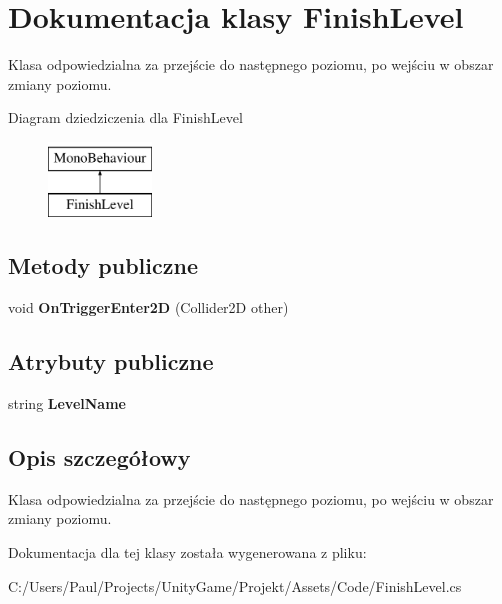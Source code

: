 \section{Dokumentacja klasy Finish\+Level}
\label{class_finish_level}


Klasa odpowiedzialna za przejście do następnego poziomu, po wejściu w obszar zmiany poziomu.  


Diagram dziedziczenia dla Finish\+Level\begin{figure}[H]
\begin{center}
\leavevmode
\includegraphics[height=2.000000cm]{class_finish_level}
\end{center}
\end{figure}
\subsection*{Metody publiczne}
\begin{DoxyCompactItemize}
\item 
void {\bfseries On\+Trigger\+Enter2\+D} (Collider2\+D other)\label{class_finish_level_a804424e6504b606f708cd11cd714623e}

\end{DoxyCompactItemize}
\subsection*{Atrybuty publiczne}
\begin{DoxyCompactItemize}
\item 
string {\bfseries Level\+Name}\label{class_finish_level_a29676e91d97a2fb2ab59689b56f609a9}

\end{DoxyCompactItemize}


\subsection{Opis szczegółowy}
Klasa odpowiedzialna za przejście do następnego poziomu, po wejściu w obszar zmiany poziomu. 



Dokumentacja dla tej klasy została wygenerowana z pliku\+:\begin{DoxyCompactItemize}
\item 
C\+:/\+Users/\+Paul/\+Projects/\+Unity\+Game/\+Projekt/\+Assets/\+Code/Finish\+Level.\+cs\end{DoxyCompactItemize}
